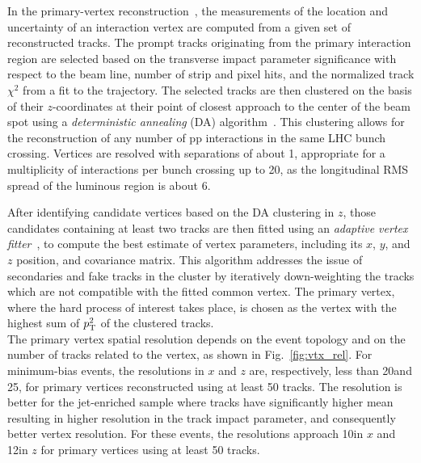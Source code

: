 In the primary-vertex reconstruction~\cite{Speer:927395}, the measurements of the location and uncertainty of an interaction vertex are computed from a given set of reconstructed tracks. The prompt tracks originating from the primary interaction region are selected based on the transverse impact parameter significance with respect to the beam line, number of strip and pixel hits, and the normalized track $\chi^2$ from a fit to the trajectory. The selected tracks are then clustered on the basis of their $z$-coordinates at their point of closest approach to the center of the beam spot using a \textit{deterministic annealing} (DA) algorithm~\cite{726788}.
This clustering allows for the reconstruction of any number of pp interactions in the same LHC bunch crossing. Vertices are resolved with separations of about 1\mm, appropriate for a multiplicity of interactions per bunch crossing up to 20, as the longitudinal RMS spread of the luminous region is about 6\cm.

After identifying candidate vertices based on the DA clustering in $z$, those candidates containing at least two tracks are then fitted using an \textit{adaptive vertex fitter}~\cite{0954-3899-34-12-N01}, to compute the best
estimate of vertex parameters, including its $x$, $y$, and $z$ position, and covariance matrix. This algorithm addresses the issue of secondaries and fake tracks in the cluster by iteratively down-weighting the tracks which are not compatible with the fitted common vertex. The primary vertex, where the hard process of interest takes place, is chosen as the vertex with the highest sum of $p_{\mathrm{T}}^2$ of the clustered tracks.\\

The primary vertex spatial resolution depends on the event topology and on the number of tracks related to the vertex, as shown in Fig.~\ref{fig:vtx_rel}. For minimum-bias events, the resolutions in $x$ and $z$ are, respectively, less than 20\mum and 25\mum, for primary vertices reconstructed using at least 50 tracks. The resolution is better for the jet-enriched sample where tracks have significantly higher mean \pt resulting in higher resolution in the track impact parameter, and consequently better vertex resolution. For these events, the resolutions approach 10\mum in $x$ and 12\mum in $z$ for primary vertices using at least 50 tracks.\\

